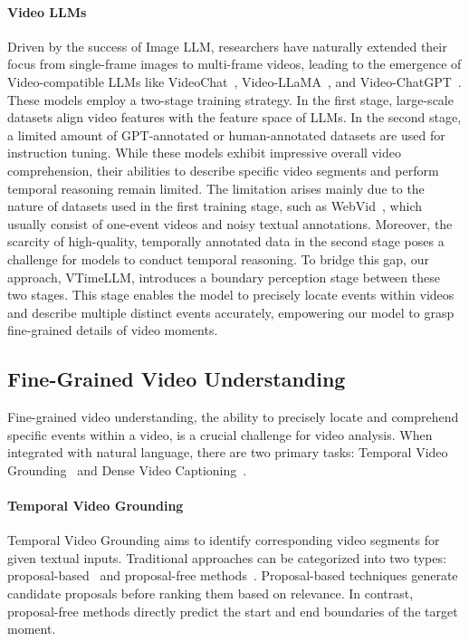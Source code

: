 \documentclass[10pt,twocolumn,letterpaper]{article}
\begin{document}
\paragraph{Video LLMs} Driven by the success of Image LLM, researchers have naturally extended their focus from single-frame images to multi-frame videos, leading to the emergence of Video-compatible LLMs like VideoChat~\cite{li2023videochat}, Video-LLaMA~\cite{zhang2023videollama}, and Video-ChatGPT~\cite{maaz2023videochatgpt}. These models employ a two-stage training strategy. In the first stage, large-scale datasets align video features with the feature space of LLMs. In the second stage, a limited amount of GPT-annotated or human-annotated datasets are used for instruction tuning. While these models exhibit impressive overall video comprehension, their abilities to describe specific video segments and perform temporal reasoning remain limited. The limitation arises mainly due to the nature of datasets used in the first training stage, such as WebVid~\cite{bain2021webvid}, which usually consist of one-event videos and noisy textual annotations. Moreover, the scarcity of high-quality, temporally annotated data in the second stage poses a challenge for models to conduct temporal reasoning. To bridge this gap, our approach, VTimeLLM, introduces a boundary perception stage between these two stages. This stage enables the model to precisely locate events within videos and describe multiple distinct events accurately, empowering our model to grasp fine-grained details of video moments.

\subsection{Fine-Grained Video Understanding}

Fine-grained video understanding, the ability to precisely locate and comprehend specific events within a video, is a crucial challenge for video analysis. When integrated with natural language, there are two primary tasks: Temporal Video Grounding~\cite{gao2017tall_grounding9, anne2017localizing_grounding10} and Dense Video Captioning~\cite{krishna2017dense_dense45, wang2018bidirectional_dense96}.
\paragraph{Temporal Video Grounding} Temporal Video Grounding aims to identify corresponding video segments for given textual inputs. Traditional approaches can be categorized into two types: proposal-based~\cite{zhang2019man_grounding16, yuan2019semantic_grounding17, chen2018temporally_grounding14} and proposal-free methods~\cite{yuan2019find_grounding19, ghosh2019excl_grounding20, zhang2020span_grounding23}. Proposal-based techniques generate candidate proposals before ranking them based on relevance. In contrast, proposal-free methods directly predict the start and end boundaries of the target moment.
\end{document}
